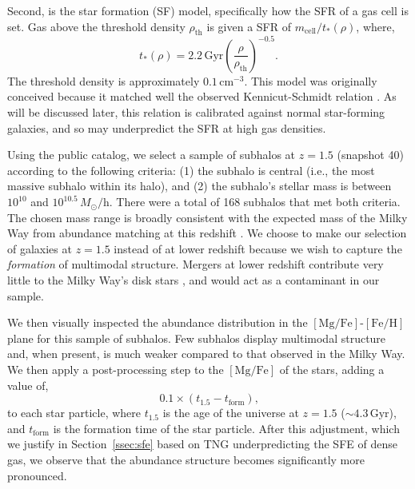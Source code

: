 \documentclass[twocolumn]{aastex631}
\newcommand{\Msun}{\ensuremath{M_{\odot}}}
\newcommand{\Gyr}{\ensuremath{\textrm{Gyr}}}
\newcommand{\FeH}{\ensuremath{[\textrm{Fe}/\textrm{H}]}}
\newcommand{\MgFe}{\ensuremath{[\textrm{Mg}/\textrm{Fe}]}}
\begin{document}
Second, is the star formation (SF) model, specifically how the SFR of a gas cell is set. Gas above the threshold density $\rho_{\textrm{th}}$ is given a SFR of $m_{\textrm{cell}}/t_{*}(\rho)$, where,
\begin{equation*}
t_{*}(\rho)=2.2\,\Gyr \left(\frac{\rho}{\rho_{\textrm{th}}}\right)^{-0.5}\textrm{.}
\end{equation*}
The threshold density is approximately $0.1\,\textrm{cm}^{-3}$. This model was originally conceived because it matched well the observed Kennicut-Schmidt relation \citep{Kennicutt1998,2003MNRAS.339..289S}. As will be discussed later, this relation is calibrated against normal star-forming galaxies, and so may underpredict the SFR at high gas densities.

Using the public catalog, we select a sample of subhalos at $z=1.5$ (snapshot 40) according to the following criteria: (1) the subhalo is central (i.e., the most massive subhalo within its halo), and (2) the subhalo's stellar mass is between $10^{10}$ and $10^{10.5}\,\Msun/\textrm{h}$. There were a total of 168 subhalos that met both criteria. The chosen mass range is broadly consistent with the expected mass of the Milky Way from abundance matching at this redshift \citep{2013ApJ...771L..35V}. We choose to make our selection of galaxies at $z=1.5$ instead of at lower redshift because we wish to capture the \textit{formation} of multimodal structure. Mergers at lower redshift contribute very little to the Milky Way's disk stars \citep[e.g.,][]{2016ARA&A..54..529B}, and would act as a contaminant in our sample.

We then visually inspected the abundance distribution in the \MgFe{}-\FeH{} plane for this sample of subhalos. Few subhalos display multimodal structure and, when present, is much weaker compared to that observed in the Milky Way. We then apply a post-processing step to the \MgFe{} of the stars, adding a value of,
\begin{equation*}
  0.1\times\left(t_{1.5}-t_{\textrm{form}}\right)\textrm{,}
\end{equation*}
to each star particle, where $t_{1.5}$ is the age of the universe at $z=1.5$ ($\sim4.3\,\Gyr$), and $t_{\textrm{form}}$ is the formation time of the star particle. After this adjustment, which we justify in Section~\ref{ssec:sfe} based on TNG underpredicting the SFE of dense gas, we observe that the abundance structure becomes significantly more pronounced.
\end{document}
